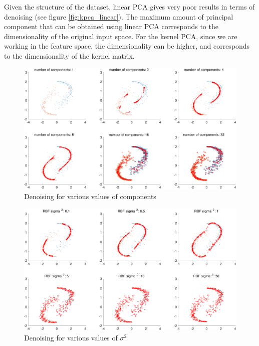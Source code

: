 \documentclass[11pt, a4paper]{article}
\begin{document}
Given the structure of the dataset, linear PCA gives very poor results
in terms of denoising (see figure \ref{fig:kpca_linear}). The maximum
amount of principal component that can be obtained using linear PCA
corresponds to the dimensionality of the original input space. For the
kernel PCA, since we are working in the feature space, the
dimensionality can be higher, and corresponds to the dimensionality of
the kernel matrix.


\begin{figure}[H]
  \centering
  \includegraphics[scale=.40]{kpca_ncomp.pdf}
  \caption{Denoising for various values of components}
  \label{fig:kpca_ncomp}
\end{figure}

\begin{figure}[H]
  \centering
  \includegraphics[scale=.40]{kpca_sigma.pdf}
  \caption{Denoising for various values of $\sigma^2$}
  \label{fig:kpca_sigma}
\end{figure}
\end{document}
